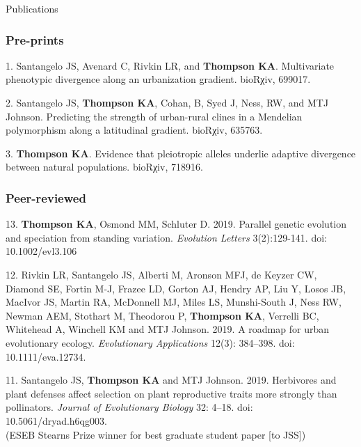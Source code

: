 \documentclass[11pt]{article}
\begin{document}
\noindent\begin{rSection}{Publications}

\subsubsection*{Pre-prints}

\noindent\hspace{.1cm}1. Santangelo JS, Avenard C, Rivkin LR, and \textbf{Thompson KA}. Multivariate phenotypic divergence along an urbanization gradient. bioRχiv, 699017.

\noindent\hspace{.1cm}2. Santangelo JS, \textbf{Thompson KA}, Cohan, B, Syed J, Ness, RW, and MTJ Johnson. Predicting the strength of urban-rural clines in a Mendelian polymorphism along a latitudinal gradient. bioRχiv, 635763.

\noindent\hspace{.1cm}3. \textbf{Thompson KA}. Evidence that pleiotropic alleles underlie adaptive divergence between natural populations. bioRχiv, 718916.

\subsubsection*{Peer-reviewed}

\noindent\hspace{.1cm}13. \textbf{Thompson KA}, Osmond MM, Schluter D. 2019. Parallel genetic evolution and speciation from standing variation. \textit{Evolution Letters} 3(2):129-141. doi: 10.1002/evl3.106

\noindent\hspace{.1cm}12.  Rivkin LR, Santangelo JS, Alberti M, Aronson MFJ, de Keyzer CW, Diamond SE, Fortin M-J, Frazee LD, Gorton AJ, Hendry AP, Liu Y, Losos JB, MacIvor JS, Martin RA, McDonnell MJ, Miles LS, Munshi-South J, Ness RW, Newman AEM, Stothart M, Theodorou P, \textbf{Thompson KA}, Verrelli BC, Whitehead A, Winchell KM and MTJ Johnson. 2019. A roadmap for urban evolutionary ecology. \textit{Evolutionary Applications} 12(3): 384–398. doi: 10.1111/eva.12734.

\noindent\hspace{.1cm}11. Santangelo JS, \textbf{Thompson KA} and MTJ Johnson. 2019. Herbivores and plant defenses affect selection on plant reproductive traits more strongly than pollinators. \textit{Journal of Evolutionary Biology} 32: 4–18. doi: 10.5061/dryad.h6qg003. \\
(ESEB Stearns Prize winner for best graduate student paper [to JSS])


\end{rSection}
\end{document}
